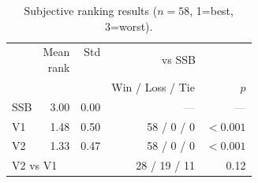 \begin{table}
  \centering
  \caption{Subjective ranking results ($n=58$, 1=best, 3=worst).}
  \label{tab:ota_table}
  \begin{tabular}{lrrrr}
    \toprule
    & \shortstack{Mean\\rank} & \shortstack{Std\\~} & \multicolumn{2}{c}{vs SSB} \\
    \cmidrule(lr){4-5}
    &  & & Win / Loss / Tie & $p$ \\
    \midrule
    SSB  & 3.00 & 0.00 & \textcolor{gray}{---} & \textcolor{gray}{---} \\
    V1   & 1.48 & 0.50 & 58 / 0 / 0  & $<0.001$ \\
    V2   & 1.33 & 0.47 & 58 / 0 / 0  & $<0.001$ \\
    \midrule
    \multicolumn{3}{l}{V2 vs V1} & 28 / 19 / 11 & 0.12 \\
    \bottomrule
  \end{tabular}
\end{table}

